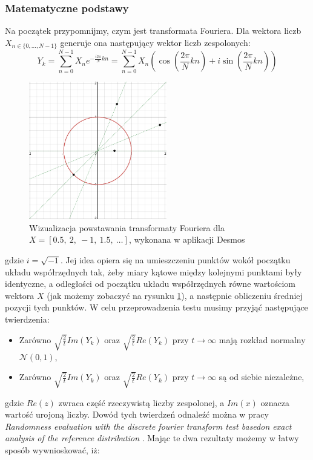 \subsubsection{Matematyczne podstawy}
Na początek przypomnijmy, czym jest transformata Fouriera. Dla wektora liczb $X_{n \in \{0, \dots, N-1\}}$ generuje ona następujący wektor liczb zespolonych:
\begin{equation}
    Y_k = \sum_{n = 0}^{N - 1}X_ne^{-\frac{i2\pi}{N}k n} = \sum_{n = 0}^{N - 1}X_n\left(\cos\left(\frac{2\pi}{N}k n\right) + i \sin\left(\frac{2\pi}{N}k n\right)\right)
\end{equation}
\begin{figure}[!htp]
    \centering
    \includegraphics[width=6cm]{furier}
    \caption{Wizualizacja powstawania transformaty Fouriera dla $X=\left[0.5,\ 2,\ -1,\ 1.5,\ \dots\right]$, wykonana w aplikacji Desmos}
    \label{fig:fourier_vis}
\end{figure}
gdzie $i = \sqrt{-1}$. Jej idea opiera się na umieszczeniu punktów wokół początku układu współrzędnych tak, żeby miary kątowe między kolejnymi punktami były identyczne, a odległości od początku układu współrzędnych równe wartościom wektora $X$ (jak możemy zobaczyć na rysunku \ref{fig:fourier_vis}), a następnie obliczeniu średniej pozycji tych punktów. W celu przeprowadzenia testu musimy przyjąć następujące twierdzenia:
\begin{itemize}
    \item Zarówno $\sqrt{\frac{2}{t}} Im(Y_k)$ oraz $\sqrt{\frac{2}{t}} Re(Y_k)$ przy $t \to \infty$ mają rozkład normalny $\mathcal{N}\left(0, 1\right)$,
    \item Zarówno $\sqrt{\frac{2}{t}} Im(Y_k)$ oraz $\sqrt{\frac{2}{t}} Re(Y_k)$ przy $t \to \infty$ są od siebie niezależne,
\end{itemize}
gdzie $Re(z)$ zwraca część rzeczywistą liczby zespolonej, a $Im(x)$ oznacza wartość urojoną liczby. Dowód tych twierdzeń odnaleźć można w pracy \emph{Randomness evaluation with the discrete fourier transform test basedon exact analysis of the reference distribution} \cite{Fourier_test}. Mając te dwa rezultaty możemy w łatwy sposób wywnioskować, iż:
